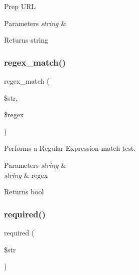Prep U\+RL


\begin{DoxyParams}{Parameters}
{\em string} & \\
\hline
\end{DoxyParams}
\begin{DoxyReturn}{Returns}
string 
\end{DoxyReturn}
\mbox{\label{class_c_i___form__validation_acef19e29276dbdd2c69dffd5ec635600}} 
\subsubsection{\texorpdfstring{regex\+\_\+match()}{regex\_match()}}
{\footnotesize\ttfamily regex\+\_\+match (\begin{DoxyParamCaption}\item[{}]{\$str,  }\item[{}]{\$regex }\end{DoxyParamCaption})}

Performs a Regular Expression match test.


\begin{DoxyParams}{Parameters}
{\em string} & \\
\hline
{\em string} & regex \\
\hline
\end{DoxyParams}
\begin{DoxyReturn}{Returns}
bool 
\end{DoxyReturn}
\mbox{\label{class_c_i___form__validation_ada72eadfd041118d5f429a93dd0de07e}} 
\subsubsection{\texorpdfstring{required()}{required()}}
{\footnotesize\ttfamily required (\begin{DoxyParamCaption}\item[{}]{\$str }\end{DoxyParamCaption})}

